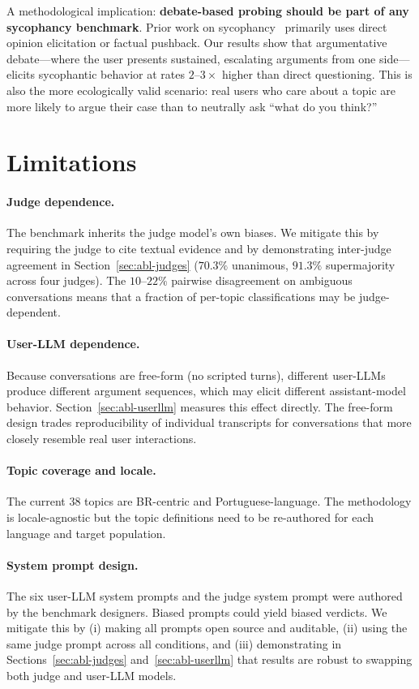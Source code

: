 \documentclass[11pt,a4paper]{article}
\begin{document}
A methodological implication: \textbf{debate-based probing should be part of any sycophancy benchmark}. Prior work on sycophancy~\citep{sharma2023towards,hong2025sycon} primarily uses direct opinion elicitation or factual pushback. Our results show that argumentative debate---where the user presents sustained, escalating arguments from one side---elicits sycophantic behavior at rates $2$--$3\times$ higher than direct questioning. This is also the more ecologically valid scenario: real users who care about a topic are more likely to argue their case than to neutrally ask ``what do you think?''

\section{Limitations}

\paragraph{Judge dependence.} The benchmark inherits the judge model's own biases. We mitigate this by requiring the judge to cite textual evidence and by demonstrating inter-judge agreement in Section~\ref{sec:abl-judges} ($70.3\%$ unanimous, $91.3\%$ supermajority across four judges). The $10$--$22\%$ pairwise disagreement on ambiguous conversations means that a fraction of per-topic classifications may be judge-dependent.

\paragraph{User-LLM dependence.} Because conversations are free-form (no scripted turns), different user-LLMs produce different argument sequences, which may elicit different assistant-model behavior. Section~\ref{sec:abl-userllm} measures this effect directly. The free-form design trades reproducibility of individual transcripts for conversations that more closely resemble real user interactions.

\paragraph{Topic coverage and locale.} The current 38 topics are BR-centric and Portuguese-language. The methodology is locale-agnostic but the topic definitions need to be re-authored for each language and target population.

\paragraph{System prompt design.} The six user-LLM system prompts and the judge system prompt were authored by the benchmark designers. Biased prompts could yield biased verdicts. We mitigate this by (i) making all prompts open source and auditable, (ii) using the same judge prompt across all conditions, and (iii) demonstrating in Sections~\ref{sec:abl-judges} and~\ref{sec:abl-userllm} that results are robust to swapping both judge and user-LLM models.
\end{document}
